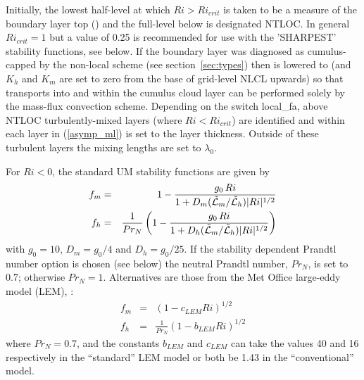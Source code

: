 \documentclass{UMDP_article}
\begin{document}
Initially, the lowest half-level at which $Ri>Ri_{crit}$ is taken to
be a measure of the boundary layer top (\zloc) and the full-level
below is designated NTLOC.  In general $Ri_{crit}=1$ but a value of
0.25 is recommended for use with the 'SHARPEST' stability functions,
see below.  If the boundary layer was diagnosed as cumulus-capped by
the non-local scheme (see section~\ref{sec:types}) then \zloc is
lowered to \zlcl (and $K_h$ and $K_m$ are set to zero from the base of
grid-level NLCL upwards) so that transports into and within the
cumulus cloud layer can be performed solely by the mass-flux
convection scheme.  Depending on the switch local\_fa, above NTLOC 
turbulently-mixed layers (where $Ri<Ri_{crit}$) are identified 
and within each layer \zloc in (\ref{asymp_ml}) is set to the layer 
thickness.  Outside of these turbulent layers the mixing lengths 
are set to $\lambda_0$.

For $Ri < 0$, the standard UM stability functions are given by 
\begin{eqnarray}
  f_m & =& 1 - \frac{g_0 \,Ri}
          {1+D_m(\tilde{{\cal L}}_m/\tilde{{\cal L}}_h)|Ri|^{1/2} } \nonumber\\ 
  f_h & =& \frac{1}{Pr_N}\left(1 - \frac{g_0 \,Ri}
          {1+D_h(\tilde{{\cal L}}_m/\tilde{{\cal L}}_h)|Ri|^{1/2} }\right) 
\end{eqnarray}
\label{unstable_stab}
with $g_0=10$, $D_m=g_0/4$ and $D_h=g_0/25$. If the stability
dependent Prandtl number option is chosen (see below) the neutral
Prandtl number, $Pr_N$, is set to $0.7$; otherwise
$Pr_N=1$. Alternatives are those from the Met Office large-eddy model
(LEM), \cite{brown1999}:
\begin{eqnarray}
  f_m & =& (1 - c_{LEM} Ri)^{1/2} \nonumber\\
  f_h & =& \frac{1}{Pr_N}\left(1 - b_{LEM} Ri\right)^{1/2}
\end{eqnarray}
\label{unstable_stab_lem}
where $Pr_N = 0.7$, and the constants $b_{LEM}$ and $c_{LEM}$ can take
the values 40 and 16 respectively in the ``standard'' LEM model or
both be 1.43 in the ``conventional'' model.
\end{document}
